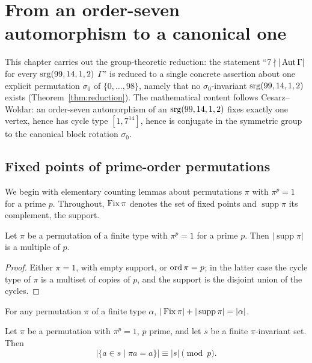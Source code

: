 \chapter{From an order-seven automorphism to a canonical one}\label{sec:group}

This chapter carries out the group-theoretic reduction: the statement
``$7 \nmid |\operatorname{Aut}\Gamma|$ for every $\mathrm{srg}(99,14,1,2)$ $\Gamma$'' is reduced to a
single concrete assertion about one explicit permutation $\sigma_0$ of
$\{0,\dots,98\}$, namely that no $\sigma_0$-invariant $\mathrm{srg}(99,14,1,2)$ exists
(Theorem~\ref{thm:reduction}).  The mathematical content follows
Cesarz--Woldar: an order-seven automorphism of an $\mathrm{srg}(99,14,1,2)$ fixes
exactly one vertex, hence has cycle type $[1,7^{14}]$, hence is conjugate in
the symmetric group to the canonical block rotation $\sigma_0$.

\section{Fixed points of prime-order permutations}

We begin with elementary counting lemmas about permutations $\pi$ with
$\pi^p = 1$ for a prime $p$.  Throughout, $\operatorname{Fix}\pi$ denotes the set of fixed
points and $\operatorname{supp}\pi$ its complement, the support.

\begin{lemma}\label{lem:grp-support-multiple}
Let $\pi$ be a permutation of a finite type with $\pi^p = 1$ for a prime $p$.
Then $|\operatorname{supp}\pi|$ is a multiple of $p$.
\leanok
\end{lemma}

\begin{proof}\leanok
Either $\pi = 1$, with empty support, or $\operatorname{ord}\pi = p$; in the latter case the
cycle type of $\pi$ is a multiset of copies of $p$, and the support is the
disjoint union of the cycles.
\end{proof}

\begin{lemma}\label{lem:grp-fix-support}
For any permutation $\pi$ of a finite type $\alpha$,
$|\operatorname{Fix}\pi| + |\operatorname{supp}\pi| = |\alpha|$.
\leanok
\end{lemma}

\begin{lemma}\label{lem:grp-fixed-congruence}
Let $\pi$ be a permutation with $\pi^p = 1$, $p$ prime, and let $s$ be a
finite $\pi$-invariant set.  Then
\[
  |\{a \in s \mid \pi a = a\}| \equiv |s| \pmod p .
\]
\leanok
\end{lemma}

